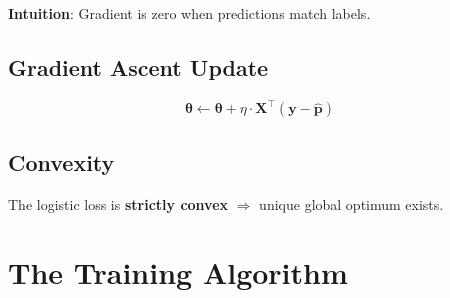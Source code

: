 \documentclass[main.tex]{subfiles}
\begin{document}
\textbf{Intuition}: Gradient is zero when predictions match labels.

\subsection{Gradient Ascent Update}

$$\boldsymbol{\theta} \leftarrow \boldsymbol{\theta} + \eta \cdot \mathbf{X}^\top(\mathbf{y} - \hat{\mathbf{p}})$$

\subsection{Convexity}

The logistic loss is \textbf{strictly convex} $\Rightarrow$ unique global optimum exists.

\section{The Training Algorithm}
\end{document}
